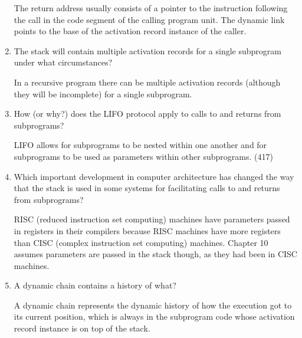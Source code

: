 \begin{enumerate}
  \begin{answer}
 The return address usually consists of a pointer to the instruction following the call in the code segment of the calling program unit.  The dynamic link points to the base of the activation record instance of the caller.


  \end{answer}

  \item The stack will contain multiple activation
    records for a single subprogram under what
    circumstances?

    \begin{answer}
   
      In a recursive program there can be multiple activation records (although they will be incomplete) for a single subprogram.

    \end{answer}

  \item How (or why?) does the LIFO protocol apply to
    calls to and returns from subprograms?
    \begin{answer}
      LIFO allows for subprograms to be nested within one another and for subprograms to be used as parameters within other subprograms. (417)

    \end{answer}

  \item Which important development in computer architecture
    has changed the way that the stack is used in some
    systems for facilitating calls to and returns from
    subprograms?

    \begin{answer}
      RISC (reduced instruction set computing) machines have parameters passed in registers in their compilers because RISC machines have more registers than CISC (complex instruction set computing) machines. Chapter 10 assumes parameters are passed in the stack though, as they had been in CISC machines.

    \end{answer}

  \item A dynamic chain contains a history of what?
 \begin{answer}
   A dynamic chain represents the dynamic history of how the execution got to its current position, which is always in the subprogram code whose activation record instance is on top of the stack.


\end{answer}
\end{enumerate}
